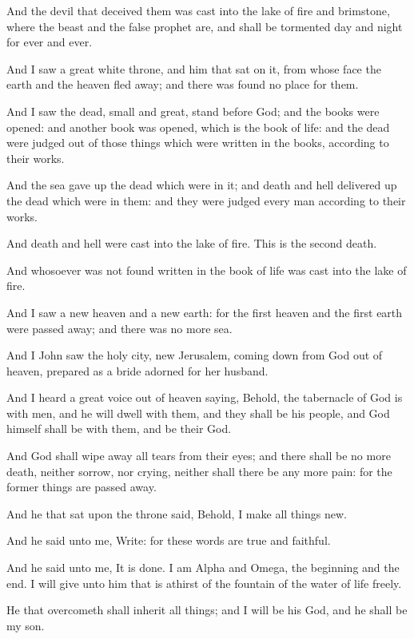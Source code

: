 \Verse And the devil that deceived them was cast into the lake of fire and brimstone, where the beast and the false prophet are, and shall be tormented day and night for ever and ever.

\Verse And I saw a great white throne, and him that sat on it, from whose face the earth and the heaven fled away; and there was found no place for them.

\Verse And I saw the dead, small and great, stand before God; and the books were opened: and another book was opened, which is the book of life: and the dead were judged out of those things which were written in the books, according to their works.

\Verse And the sea gave up the dead which were in it; and death and hell delivered up the dead which were in them: and they were judged every man according to their works.

\Verse And death and hell were cast into the lake of fire. This is the second death.

\Verse And whosoever was not found written in the book of life was cast into the lake of fire.

\Chapter
\Verse And I saw a new heaven and a new earth: for the first heaven and the first earth were passed away; and there was no more sea.

\Verse And I John saw the holy city, new Jerusalem, coming down from God out of heaven, prepared as a bride adorned for her husband.

\Verse And I heard a great voice out of heaven saying, Behold, the tabernacle of God is with men, and he will dwell with them, and they shall be his people, and God himself shall be with them, and be their God.

\Verse And God shall wipe away all tears from their eyes; and there shall be no more death, neither sorrow, nor crying, neither shall there be any more pain: for the former things are passed away.

\Verse And he that sat upon the throne said, Behold, I make all things new.

And he said unto me, Write: for these words are true and faithful.

\Verse And he said unto me, It is done. I am Alpha and Omega, the beginning and the end. I will give unto him that is athirst of the fountain of the water of life freely.

\Verse He that overcometh shall inherit all things; and I will be his God, and he shall be my son.


